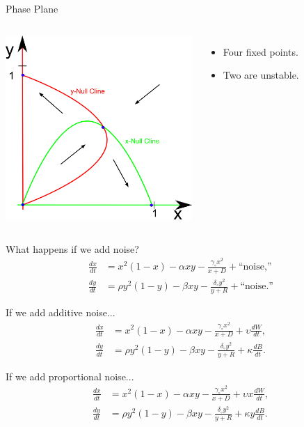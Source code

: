 \begin{frame}{Phase Plane}

  \vfill
  
  \begin{columns}
       \includegraphics[height=7cm]{img/typeIPhasePlane}
    \begin{itemize}
    \item Four fixed points.
    \item Two are unstable.
    \end{itemize}
  \end{columns}
\end{frame}

\begin{frame}
		What happens if we add noise?
	\begin{align*}
		\frac{dx}{dt} &= x^2 (1-x) - \alpha xy - \frac{\gamma_\circ x^2}{x+D} + \text{``noise,''} \\
    \frac{dy}{dt} &= \rho y^2 (1-y) - \beta xy -\frac{\delta_\circ y^2}{y+R}+ \text{``noise.''}
	\end{align*}
\end{frame}

\begin{frame}
		If we add additive noise... 
	\begin{align*}
		\frac{dx}{dt} &= x^2 (1-x) - \alpha xy - \frac{\gamma_\circ x^2}{x+D} + \upsilon \frac{dW}{dt}, \\
    \frac{dy}{dt} &= \rho y^2 (1-y) - \beta xy -\frac{\delta_\circ y^2}{y+R}+ \kappa \frac{dB}{dt}.
	\end{align*}
\end{frame}

\begin{frame}
		If we add proportional noise... 
	\begin{align*}
		\frac{dx}{dt} &= x^2 (1-x) - \alpha xy - \frac{\gamma_\circ x^2}{x+D} + \upsilon x \frac{dW}{dt}, \\
    \frac{dy}{dt} &= \rho y^2 (1-y) - \beta xy -\frac{\delta_\circ y^2}{y+R}+ \kappa y \frac{dB}{dt}.
	\end{align*}
\end{frame}




